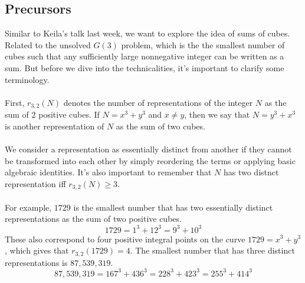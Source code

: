 \subsection{Precursors}
Similar to Keila's talk last week, we want to explore the idea of sums of cubes. Related to the unsolved $G(3)$ problem, which is the the smallest number of cubes such that any sufficiently large nonnegative integer can be written as a sum. 
But before we dive into the technicalities, it's important to  clarify some terminology.\\
\\
First, $r_{3,2}(N)$ denotes the number of representations of the integer $N$ as the sum of $2$ positive cubes. If $N = x^3 + y^3$ and $x \neq y$, then we say that $N = y^3 + x^3$ is another representation of $N$ as the sum of two cubes. \\
\\
We consider a representation as essentially distinct from another if they cannot be transformed into each other by simply reordering the terms or applying basic algebraic identities. It's also important to remember that $N$ has two distnct representation iff $r_{3,2}(N) \geq 3$. \\
\\
For example, $1729$ is the smallest number that has two essentially distinct representations as the sum of two positive cubes. 
$$
1729 = 1^3 + 12^3 = 9^3 + 10^3
$$
These also correspond to four positive integral points on the curve $1729 = x^3 + y^3$, which gives that $r_{3,2}(1729) = 4$. The smallest number that has three distinct representations is $87,539,319$.
$$
87,539,319 = 167^3 + 436^3 = 228^3 + 423^3 = 255^3 + 414^3
$$
